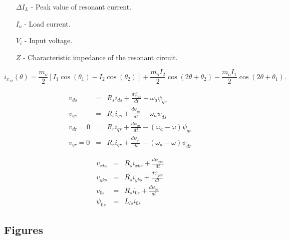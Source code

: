 \documentclass[a4paper,oneside,onecolumn,draftcls,12pt,conference]{IEEEtran}
\begin{document}
 \begin{enumerate}
 	\item[$\Delta I_{L}$]  - Peak value of resonant current.
 	\item[$I_{o}$]  - Load current.
 	\item[$V_{i}$]  - Input voltage.
 	\item[$Z$]  - Characteristic impedance of the resonant circuit.
 \end{enumerate}
 
  \begin{equation} \label{eq:ix12}
  {i_{{x_{12}}}}\left( \theta  \right) = \frac{{{m_o}}}{2}\left[ {{I_1}\cos \left( {{\theta _1}} \right) - {I_2}\cos \left( {{\theta _2}} \right)} \right]
  + \frac{{{m_o}{I_2}}}{2}\cos \left( {2\theta  + {\theta _2}} \right) - \frac{{{m_o}{I_1}}}{2}\cos \left( {2\theta  + {\theta _1}} \right).	
  \end{equation}
  
  	\begin{eqnarray}
  		{v_{ds}} &=& {R_s}{i_{ds}} + \frac{{d{\psi _{ds}}}}{{dt}} - {\omega _a}{\psi _{qs}}\\
  		{v_{qs}} &=& {R_s}{i_{qs}} + \frac{{d{\psi _{qs}}}}{{dt}} - {\omega _a}{\psi _{ds}}\\
  		{v_{dr}} = 0 &=& {R_r}{i_{qs}} + \frac{{d{\psi _{dr}}}}{{dt}} - \left( {{\omega _a} - \omega } \right){\psi _{qr}}\\
  		{v_{qr}} = 0 &= &{R_r}{i_{qr}} + \frac{{d{\psi _{qr}}}}{{dt}} - \left( {{\omega _a} - \omega } \right){\psi _{dr}}
  	\end{eqnarray}
  	
  	
  	\begin{eqnarray}
  		{v_{xks}} &=& {R_s}{i_{xks}} + \frac{{d{\psi _{xks}}}}{{dt}}\\
  		{v_{yks}} &=& {R_s}{i_{yks}} + \frac{{d{\psi _{yks}}}}{{dt}}\\	
  		{v_{0s}} &=& {R_s}{i_{0s}} + \frac{{d{\psi _{0s}}}}{{dt}}\\
  		{\psi _{0s}} &=& {L_{ls}}{i_{0s}}
  	\end{eqnarray}
  	
  

  
 \subsection{Figures}
 
\end{document}
